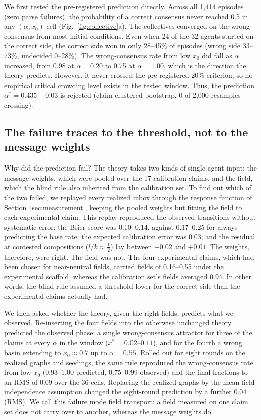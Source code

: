 \documentclass{ieeeaccess}
\newcommand{\astar}{\alpha^{*}}
\begin{document}
We first tested the pre-registered prediction directly. Across all 1{,}414
episodes (zero parse failures), the probability of a correct consensus
never reached 0.5 in any $(\alpha, x_0)$ cell (Fig.~\ref{fig:collective}a).
The collectives converged on the wrong consensus from most initial
conditions. Even when 24 of the 32 agents started on the correct side, the
correct side won in only 28--45\% of episodes (wrong side 33--73\%,
undecided 0--28\%). The wrong-consensus rate from low $x_0$ did fall as
$\alpha$ increased, from 0.98 at $\alpha = 0.20$ to 0.75 at
$\alpha = 1.00$, which is the direction the theory predicts. However, it
never crossed the pre-registered 20\% criterion, so no empirical critical
crowding level exists in the tested window. Thus, the prediction
$\astar = 0.435 \pm 0.03$ is rejected (claim-clustered bootstrap, 0 of
2{,}000 resamples crossing).

\subsection{The failure traces to the threshold, not to the message weights}

Why did the prediction fail? The theory takes two kinds of single-agent
input: the message weights, which were pooled over the 17 calibration
claims, and the field, which the blind rule also inherited from the
calibration set. To find out which of the two failed, we replayed every
realized inbox through the response function of
Section~\ref{sec:measurement}, keeping the pooled weights but fitting the
field to each experimental claim. This replay reproduced the observed
transitions without systematic error: the Brier score was 0.10--0.14,
against 0.17--0.25 for always predicting the base rate; the expected
calibration error was 0.03; and the residual at contested compositions
($l/k \approx \tfrac12$) lay between $-0.02$ and $+0.01$. The weights,
therefore, were right. The field was not. The four experimental claims,
which had been chosen for near-neutral fields, carried fields of 0.16--0.55
under the experimental scaffold, whereas the calibration set's fields
averaged 0.94. In other words, the blind rule assumed a threshold lower for
the correct side than the experimental claims actually had.

We then asked whether the theory, given the right fields, predicts what we
observed. Re-inserting the four fields into the otherwise unchanged theory
predicted the observed phase: a single wrong-consensus attractor for three
of the claims at every $\alpha$ in the window ($x^* = 0.02$--$0.11$), and
for the fourth a wrong basin extending to $x_0 \approx 0.7$ up to
$\alpha = 0.55$. Rolled out for eight rounds on the realized graphs and
seedings, the same rule reproduced the wrong-consensus rate from low $x_0$
(0.93--1.00 predicted, 0.75--0.99 observed) and the final fractions to an
RMS of 0.09 over the 36 cells. Replacing the realized graphs by the
mean-field independence assumption changed the eight-round prediction by a
further 0.04 (RMS). We call this failure mode field transport: a field
measured on one claim set does not carry over to another, whereas the
message weights do.
\end{document}

